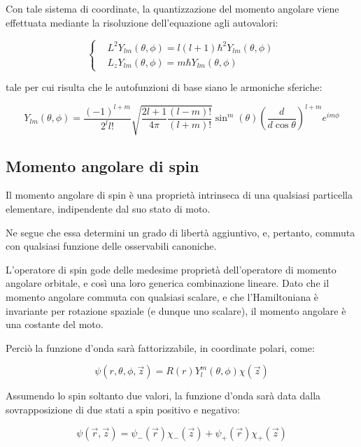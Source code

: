 \documentclass{report}
\begin{document}
Con tale sistema di coordinate, la quantizzazione del momento angolare viene effettuata mediante la risoluzione dell'equazione agli autovalori:

\begin{equation}
  \left\{
  \begin{aligned}
     & L^2Y_{lm}(\theta, \phi)=l(l+1)\hbar^2Y_{lm}(\theta, \phi) \\
     & L_zY_{lm}(\theta, \phi)=m\hbar Y_{lm}(\theta, \phi)
  \end{aligned}
  \right.
\end{equation}

tale per cui risulta che le autofunzioni di base siano le armoniche sferiche:

\begin{equation}
  Y_{lm}(\theta, \phi) = \frac{(-1)^{l+m}}{2^l l!} \sqrt{\frac{2l+1}{4\pi} \frac{(l-m)!}{(l+m)!}} \sin^m(\theta) \left( \frac{d}{d\cos{\theta}} \right)^{l+m} e^{im\phi}
\end{equation}

\subsection{Momento angolare di spin}
Il momento angolare di spin è una proprietà intrinseca di una qualsiasi particella elementare, indipendente dal suo stato di moto.

Ne segue che essa determini un grado di libertà aggiuntivo, e, pertanto, commuta con qualsiasi funzione delle osservabili canoniche.

L'operatore di spin gode delle medesime proprietà dell'operatore di momento angolare orbitale, e così una loro generica combinazione lineare.
Dato che il momento angolare commuta con qualsiasi scalare, e che l'Hamiltoniana è invariante per rotazione spaziale (e dunque uno scalare), il momento angolare è una costante del moto.

Perciò la funzione d'onda sarà fattorizzabile, in coordinate polari, come:

\begin{equation}
  \psi(r,\theta, \phi,\vec{z})=R(r)Y^m_l(\theta, \phi) \chi(\vec{z})
\end{equation}

Assumendo lo spin soltanto due valori, la funzione d'onda sarà data dalla sovrapposizione di due stati a spin positivo e negativo:

\begin{equation}
  \psi(\vec{r},\vec{z})=\psi_-(\vec{r})\chi_-(\vec{z}) + \psi_+(\vec{r})\chi_+(\vec{z})
\end{equation}
\end{document}
